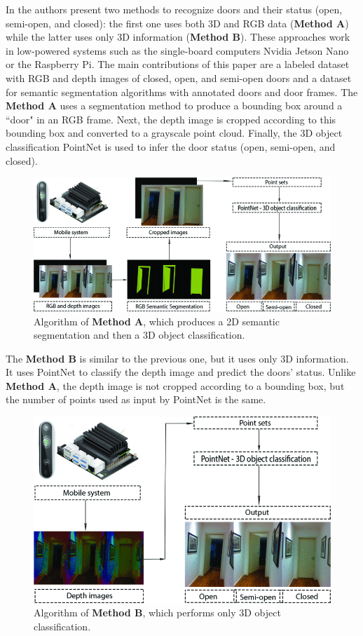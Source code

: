 In \cite{9096155} the authors present two methods to recognize doors and their status (open, semi-open, and closed): the first one uses both 3D and RGB data (\textbf{Method A}) while the latter uses only 3D information (\textbf{Method B}). These approaches work in low-powered systems such as the single-board computers Nvidia
Jetson Nano or the Raspberry Pi. The main contributions of this paper are a labeled dataset with RGB and depth images of closed, open, and semi-open doors and a dataset for semantic segmentation algorithms with annotated doors and door frames. The \textbf{Method A} uses a segmentation method to produce a bounding box around a ``door" in an RGB frame. Next, the depth image is cropped according to this bounding box and converted to a grayscale point cloud. Finally,  the 3D object classification PointNet is used to infer the door status (open, semi-open, and closed).

\begin{figure}[h!]
	\centering
	\includegraphics[width=0.48\linewidth]{images/rgb_segmentation_depth.png}
	\caption{Algorithm of \textbf{Method A}, which produces a 2D semantic segmentation and then a 3D object classification.}
\end{figure}

The \textbf{Method B} is similar to the previous one, but it uses only 3D information. It uses PointNet to classify the depth image and predict the doors' status. Unlike \textbf{Method A}, the depth image is not cropped according to a bounding box, but the number of points used as input by PointNet is the same. 

\begin{figure}[h!]
	\centering
	\includegraphics[width=0.48\linewidth]{images/depth_classification.png}
	\caption{Algorithm of \textbf{Method B}, which performs only 3D object classification.}
\end{figure}

